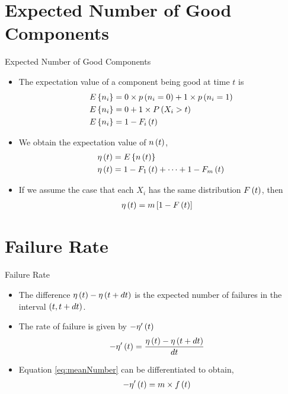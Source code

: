 \documentclass{beamer}
\begin{document}
\section{Expected Number of Good Components}
\begin{frame}{Expected Number of Good Components}
\begin{itemize}
    \item The expectation value of a component being good at time $t$ is
    \begin{align}
        E\left\{n_i\right\} &= 0 \times p\left(n_i = 0\right)
            + 1 \times p\left(n_i = 1\right) \\
        E\left\{n_i\right\} &= 0 + 1 \times P\left(X_i > t\right) \\
        E\left\{n_i\right\} &= 1 - F_i\left(t\right)
    \end{align}
    \item We obtain the expectation value of $n\left(t\right)$,
    \begin{align}
      \eta\left(t\right) &= E\left\{n\left(t\right)\right\} \\
      \eta\left(t\right) &= 1 - F_1\left(t\right) + \dots + 1 - F_m\left(t\right) 
    \end{align}
    \item If we assume the case that each $X_i$ has the same distribution $F\left(t\right)$, then
    \begin{align}
    \eta\left(t\right) &= m{}\left[1 - F\left(t\right)\right]
    \label{eq:meanNumber}
    \end{align}
\end{itemize}
\end{frame}
%
\section{Failure Rate}
\begin{frame}{Failure Rate}
    \begin{itemize}
    \item The difference $\eta\left(t\right) - \eta\left(t+dt\right) $ is the expected number of failures in the interval $\left(t, t+dt\right)$.
    \item The rate of failure is given by $- \eta'\left(t\right)$
    \begin{align}
       -\eta'\left(t\right) &= \frac{\eta\left(t\right) - \eta\left(t+dt\right)}{dt}  
    \end{align}
    \item Equation \eqref{eq:meanNumber} can be differentiated to obtain,
    \begin{align}
       -\eta'\left(t\right) &= m \times f\left(t\right)
    \end{align}
    \end{itemize}
\end{frame}
%
\end{document}
